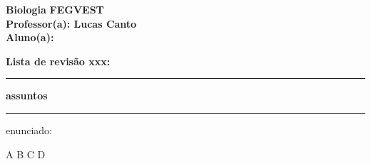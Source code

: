 \documentclass[12pt,a4paper]{exam}
\begin{document}
\noindent
\textbf{Biologia }  \hfill \textbf{FEGVEST} \\[0.4cm]
\textbf{Professor(a): Lucas Canto} \\[0.4cm]
\textbf{Aluno(a):}  \\[0.4cm]

\begin{center}
    {\Large \textbf{Lista de revisão xxx:}} \\[0.2cm]
    \rule{\textwidth}{0.5pt}
\end{center}
\begin{center}
    {\Large \textbf{assuntos}} \\[0.2cm]
    \rule{\textwidth}{0.5pt}
\end{center}

\vspace{0.5cm}

\begin{questions}

\question enunciado:
\begin{center}
\end{center}
\begin{choices}
    \choice A 
    \choice B
    \choice C 
    \choice D
\end{choices}

\end{questions}
\end{document}
